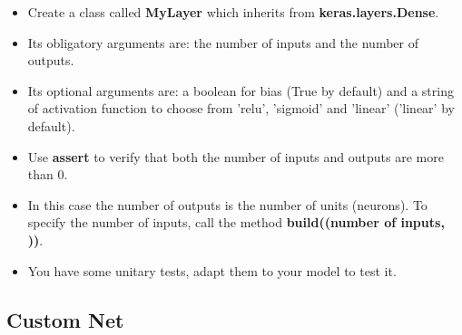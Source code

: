\documentclass[11pt, a4paper]{article}
\begin{document}
\begin{multicols}{2}
	\begin{itemize}  
		\item Create a class called \textbf{MyLayer} which inherits from \textbf{keras.layers.Dense}.
		\item Its obligatory arguments are: the number of inputs and the number of outputs.
		\item Its optional arguments are: a boolean for bias (True by default) and a string of activation function to choose from 'relu', 'sigmoid' and 'linear' ('linear' by default).
		\item Use \textbf{assert} to verify that both the number of inputs and outputs are more than 0.
		\item In this case the number of outputs is the number of units (neurons).
		To specify the number of inputs, call the method \textbf{build((number of inputs, ))}.
		\item You have some unitary tests, adapt them to your model to test it.
	\end{itemize}
	
	\subsection{Custom Net}
	

\end{multicols}
\end{document}
